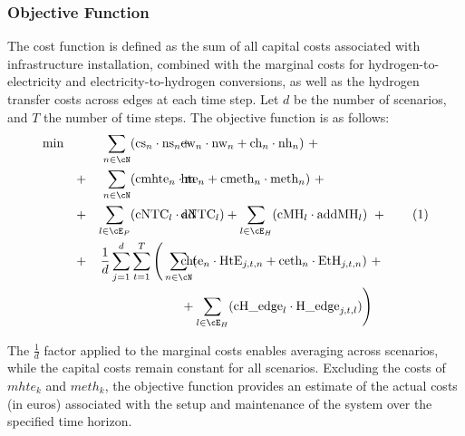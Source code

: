 \documentclass[smallextended,natbib]{svjour3}       %
\numberwithin{definition}{section}
\numberwithin{theorem}{section}
\numberwithin{proposition}{section}
\begin{document}

\subsubsection{Objective Function}

The cost function is defined as the sum of all capital costs associated with infrastructure installation, combined with the marginal costs for hydrogen-to-electricity and electricity-to-hydrogen conversions, as well as the hydrogen transfer costs across edges at each time step.
Let $d$ be the number of scenarios, and $T$ the number of time steps. The objective function is as follows:
\begin{align*}
    \min \quad
    &&\sum_{n\in\cN}&(\text{cs}_n \cdot \text{ns}_n+\hspace{-2.3em}&&\text{cw}_n \cdot \text{nw}_n + \text{ch}_n \cdot \text{nh}_n )\ + \\
    &+& \sum_{n\in\cN}&(\text{cmhte}_n\cdot\text{m} \hspace{-2.3em}&& \text{hte}_n + \text{cmeth}_n\cdot \text{meth}_n) \ + \\
    &+& \sum_{l\in\cE_P}& (\text{cNTC}_l\cdot \text{ad}\hspace{-2.3em}&&\text{dNTC}_l) 
    + \sum_{l\in\cE_H} (\text{cMH}_l\cdot \text{addMH}_l) \ + \stepcounter{equation}\tag{\theequation}\label{objVal} \\   
    &+&\frac{1}{d}\sum_{j=1}^{d}&\sum_{t=1}^{T} \Bigg(\sum_{n\in\cN} (\hspace{-2.3em} &&
    \text{chte}_n \cdot \text{HtE}_{j,t,n} + \text{ceth}_n \cdot \text{EtH}_{j,t,n})\ + \\
    &&&\hspace{-3em}&&+\sum_{l\in\cE_H} (\text{cH\_edge}_l\cdot\text{H\_edge}_{j,t,l}) \Bigg)
\end{align*}

The $\frac{1}{d}$ factor applied to the marginal costs enables averaging across scenarios, while the capital costs remain constant for all scenarios. 
Excluding the costs of $mhte_k$ and $meth_k$, the objective function provides an estimate of the actual costs (in euros) associated with the setup and maintenance of the system over the specified time horizon.

\end{document}
